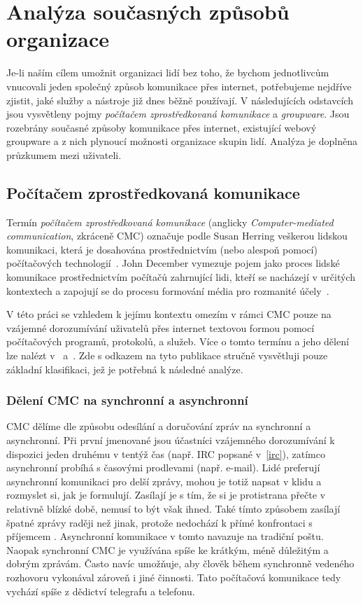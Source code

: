 \documentclass[12pt,oneside,final]{fithesis2}
\begin{document}
\chapter{Analýza současných způsobů organizace}\label{analysis}
Je-li naším cílem umožnit organizaci lidí bez toho, že bychom jednotlivcům vnucovali jeden společný způsob komunikace přes internet, potřebujeme nejdříve zjistit, jaké služby a nástroje již dnes běžně používají. V následujících odstavcích jsou vysvětleny pojmy \emph{počítačem zprostředkovaná komunikace} a \emph{groupware}. Jsou rozebrány současné způsoby komunikace přes internet, existující webový groupware a z nich plynoucí možnosti organizace skupin lidí. Analýza je doplněna průzkumem mezi uživateli.


\section{Počítačem zprostředkovaná komunikace}\label{cmc}
Termín \emph{počítačem zprostředkovaná komunikace} (anglicky \emph{Computer-mediated communication}, zkráceně CMC) označuje podle Susan Herring veškerou lidskou komunikaci, která je dosahována prostřednictvím (nebo alespoň pomocí) počítačových technologií~\cite{thurlow2004computer}. John December vymezuje pojem jako proces lidské komunikace prostřednictvím počítačů zahrnující lidi, kteří se nacházejí v určitých kontextech a zapojují se do procesu formování média pro rozmanité účely~\cite{december1997notes}.

V této práci se vzhledem k jejímu kontextu omezím v rámci CMC pouze na vzájemné dorozumívání uživatelů přes internet textovou formou pomocí počítačových programů, protokolů, a služeb. Více o tomto termínu a jeho dělení lze nalézt v~\cite{thurlow2004computer} a~\cite{rulik2006computer}. Zde s odkazem na tyto publikace stručně vysvětluji pouze základní klasifikaci, jež je potřebná k následné analýze.

\subsection{Dělení CMC na synchronní a asynchronní}
CMC dělíme dle způsobu odesílání a doručování zpráv na synchronní a asynchronní. Při první jmenované jsou účastníci vzájemného dorozumívání k dispozici jeden druhému v tentýž čas (např. IRC popsané v~\ref{irc}), zatímco asynchronní probíhá s časovými prodlevami (např. e-mail). Lidé preferují asynchronní komunikaci pro delší zprávy, mohou je totiž napsat v klidu a rozmyslet si, jak je formulují. Zasílají je s tím, že si je protistrana přečte v relativně blízké době, nemusí to být však ihned. Také tímto způsobem zasílají špatné zprávy raději než jinak, protože nedochází k přímé konfrontaci s příjemcem \cite{joszova2009trendy}. Asynchronní komunikace v tomto navazuje na tradiční poštu. Naopak synchronní CMC je využívána spíše ke krátkým, méně důležitým a dobrým zprávám. Často navíc umožňuje, aby člověk během synchronně vedeného rozhovoru vykonával zároveň i jiné činnosti. Tato počítačová komunikace tedy vychází spíše z dědictví telegrafu a telefonu.
\end{document}

